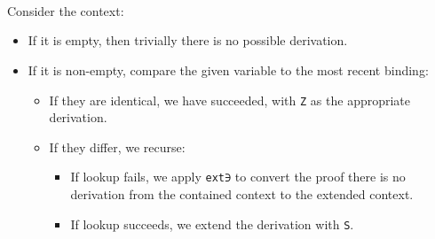 \begin{fence}
\begin{code}
\AgdaSpace{}%
\AgdaOperator{\AgdaInductiveConstructor{,}}\AgdaSpace{}%
\AgdaSpace{}%
\<%
\\
\>[0]\AgdaSpace{}%
\AgdaSymbol{|}\AgdaSpace{}%
\AgdaSpace{}%
\AgdaSpace{}%
\AgdaSpace{}%
\AgdaSpace{}%
\AgdaSpace{}%
\<%
\\
\>[0]%
\>[16]\AgdaSymbol{|}\AgdaSpace{}%
%
\>[22]%
\>[34]\AgdaSymbol{=}%
\>[37]%
\>[41]\AgdaSymbol{(}\AgdaSpace{}%
\AgdaSpace{}%
\AgdaSymbol{)}\<%
\\
\>[0]%
\>[16]\AgdaSymbol{|}\AgdaSpace{}%
\AgdaSpace{}%
\AgdaSpace{}%
\AgdaSpace{}%
\AgdaOperator{\AgdaInductiveConstructor{,}}\AgdaSpace{}%
\AgdaSpace{}%
%
\>[34]\AgdaSymbol{=}%
\>[37]\AgdaSpace{}%
\AgdaSpace{}%
\AgdaSpace{}%
\AgdaOperator{\AgdaInductiveConstructor{,}}\AgdaSpace{}%
\AgdaSpace{}%
\AgdaSpace{}%
\AgdaSpace{}%
\<%
\end{code}
\end{fence}

Consider the context:

\begin{itemize}
\item
  If it is empty, then trivially there is no possible derivation.
\item
  If it is non-empty, compare the given variable to the most recent
  binding:

  \begin{itemize}
  \item
    If they are identical, we have succeeded, with \texttt{Z} as the
    appropriate derivation.
  \item
    If they differ, we recurse:

    \begin{itemize}
    \item
      If lookup fails, we apply \texttt{ext∋} to convert the proof there
      is no derivation from the contained context to the extended
      context.
    \item
      If lookup succeeds, we extend the derivation with \texttt{S}.
    \end{itemize}
  \end{itemize}
\end{itemize}

